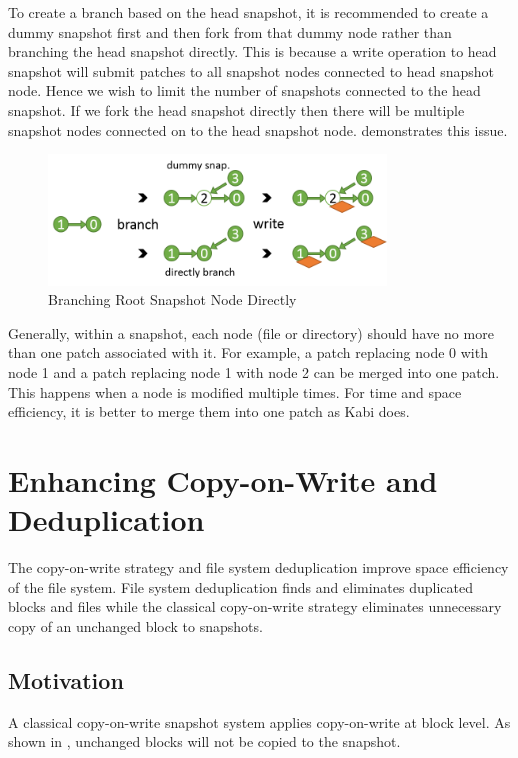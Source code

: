     To create a branch based on the head snapshot, it is recommended to create a dummy snapshot first and then fork from that dummy node rather than branching the head snapshot directly. This is because a write operation to head snapshot will submit patches to all snapshot nodes connected to head snapshot node. Hence we wish to limit the number of snapshots connected to the head snapshot. If we fork the head snapshot directly then there will be multiple snapshot nodes connected on to the head snapshot node.  demonstrates this issue.

\begin{figure}[t]
\centering
\includegraphics[width=0.8\textwidth]{Chapter-4/figs/fig16.png}
\caption{Branching Root Snapshot Node Directly}
\label{fig:dummy_node}
\end{figure}

	Generally, within a snapshot, each node (file or directory) should have no more than one patch associated with it. For example, a patch replacing node 0 with node 1 and a patch replacing node 1 with node 2 can be merged into one patch. This happens when a node is modified multiple times. For time and space efficiency, it is better to merge them into one patch as Kabi does.
	
\section{Enhancing Copy-on-Write and Deduplication}

	The copy-on-write strategy and file system deduplication improve space efficiency of the file system. File system deduplication finds and eliminates duplicated blocks and files while the classical copy-on-write strategy eliminates unnecessary copy of an unchanged block to snapshots.

\subsection{Motivation}

    A classical copy-on-write snapshot system applies copy-on-write at block level. As shown in , unchanged blocks will not be copied to the snapshot.

